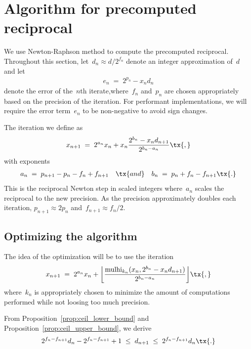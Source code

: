 \documentclass[12pt,oneside,draft]{scrartcl}
\begin{document}
\section{Algorithm for precomputed reciprocal}

We use Newton-Raphson method to compute the precomputed reciprocal.  Throughout this section, let~$d_{n} \approx d / 2^{f_{n}}$ denote an integer approximation of~$d$ and let
\begin{gather}
  e_{n}
\;=\;
  2^{p_{n}} - x_{n} d_{n}
\end{gather}
denote the error of the~$n$th iterate,where~$f_{n}$ and~$p_{n}$ are chosen appropriately based on the precision of the iteration.  For performant implementations, we will require the error term~$e_{n}$ to be non-negative to avoid sign changes.

The iteration we define as
\begin{gather}
  x_{n + 1}
\;=\;
  2^{a_{n}} x_{n} + x_{n} \frac{2^{b_{n}} - x_{n} d_{n + 1}}{2^{b_{n} - a_{n}}}
\tx{,}
\label{eq:newton}
\end{gather}
with exponents
\begin{gather}
  a_{n}
\;=\;
  p_{n + 1} - p_{n} - f_{n} + f_{n + 1}
\quad\tx{and}\quad
  b_{n}
\;=\;
  p_{n} + f_{n} - f_{n + 1}
\tx{.}
\label{eq:newton_exp}
\end{gather}
This is the reciprocal Newton step in scaled integers where~$a_{n}$ scales the reciprocal to the new precision.  As the precision approximately doubles each iteration, $p_{n + 1} \approx 2 p_{n}$ and~$f_{n + 1} \approx f_{n} / 2$.

\subsection{Optimizing the algorithm}

The idea of the optimization will be to use the iteration
\begin{gather}
  x_{n + 1}
\;=\;
  2^{a_{n}} x_{n}
  +
  \biggl\lfloor \frac{\mulhi_{k_{n}}(x_{n}, 2^{b_{n}} - x_{n} d_{n + 1})}{2^{b_{n} - a_{n}}} \biggr\rfloor
\tx{,}
\end{gather}
where~$k_{n}$ is appropriately chosen to minimize the amount of computations performed while not loosing too much precision.

\iffalse
From Proposition~\ref{prop:ceil_lower_bound} and Proposition~\ref{prop:ceil_upper_bound}, we derive
\begin{gather}
  2^{f_{n} - f_{n + 1}} d_{n} - 2^{f_{n} - f_{n + 1}} + 1
\;\le\;
  d_{n + 1}
\;\le\;
  2^{f_{n} - f_{n + 1}} d_{n}
\tx{.}
\label{eq:dn1}
\end{gather}
\end{document}

